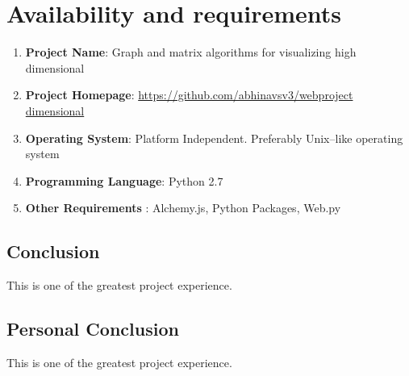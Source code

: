 \section{Availability and requirements}
\begin{enumerate}
\item \textbf{Project Name}: Graph and matrix algorithms for visualizing high dimensional
\item \textbf{Project Homepage}: \url{https://github.com/abhinavsv3/webproject dimensional}
\item \textbf{Operating System}: Platform Independent. Preferably Unix--like operating system
\item \textbf{Programming Language}: Python 2.7
\item \textbf{Other Requirements} : Alchemy.js, Python Packages, Web.py
\end{enumerate}

\subsection{Conclusion}
This is one of the greatest project experience.	
\subsection{Personal Conclusion}
This is one of the greatest project experience.	



\lstlistoflistings



{}





